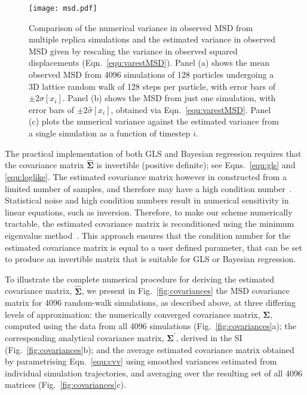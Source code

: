 \documentclass[reprint,superscriptaddress,nobibnotes,amsmath,amssymb,aps,prx,hidelinks,linenumbers]{revtex4-2}
\newcommand{\oMSDi}{\ensuremath{x_i}}
\begin{document}
\begin{figure}
    \centering
    \texttt{[image: msd.pdf]}
    \caption{
        Comparison of the numerical variance in observed MSD from multiple replica simulations and the estimated variance in observed MSD given by rescaling the variance in observed squared displacements (Eqn.~\ref{equ:varestMSD}).
        Panel (a) shows the mean observed MSD from \num{4096} simulations of \num{128} particles undergoing a 3D lattice random walk of \num{128} steps per particle, with error bars of $\pm2\sigma[\oMSDi]$.
        Panel (b) shows the MSD from just one simulation, with error bars of $\pm2\widehat{\sigma}[\oMSDi]$, obtained via Eqn.~\ref{equ:varestMSD}.
        Panel (c) plots the numerical variance against the estimated variance from a single simulation as a function of timestep $i$.
    }
    \label{fig:msd}
\end{figure}

The practical implementation of both GLS and Bayesian regression requires that the covariance matrix $\widehat{\mathbf{\Sigma}}$ is invertible (positive definite); see Eqns.~\ref{equ:gls} and \ref{equ:loglike}.
The estimated covariance matrix however in constructed from a limited number of samples, and therefore may have a high condition number~\cite{higham_restoring_2016}. 
Statistical noise and high condition numbers result in numerical sensitivity in linear equations, such as inversion. 
Therefore, to make our scheme numerically tractable, the estimated covariance matrix is reconditioned using the minimum eigenvalue method~\cite{tabeart_improving_2020}. 
This approach ensures that the condition number for the estimated covariance matrix is equal to a user defined parameter, that can be set to produce an invertible matrix that is suitable for GLS or Bayesian regression.

To illustrate the complete numerical procedure for deriving the estimated covariance matrix, $\widehat{\mathbf{\Sigma}}$, we present in Fig.~\ref{fig:covariances} the MSD covariance matrix for \num{4096} random-walk simulations, as described above, at three differing levels of approximation:
the numerically converged covariance matrix, $\bm{\Sigma}$, computed using the data from all \num{4096} simulations (Fig.~\ref{fig:covariances}a);
the corresponding analytical covariance matrix, $\mathbf{\Sigma^\prime}$, derived in the SI (Fig.~\ref{fig:covariances}b); and the average estimated covariance matrix obtained by parametrising Eqn.~\ref{equ:cvv} using smoothed variances estimated from individual simulation trajectories, and averaging over the resulting set of all \num{4096} matrices (Fig.~\ref{fig:covariances}c).
\end{document}
